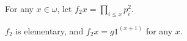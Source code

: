 For any $x \in \omega$, let $f_2 x = \prod_{i \leq x} p_i^2.$

$f_2$ is elementary, and $f_2 x = g 1^{(x+1)}$ for any $x$.

